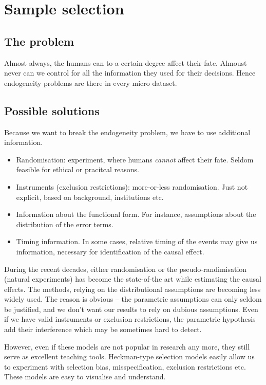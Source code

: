 \section{Sample selection}


\subsection{The problem}

Almost always, the humans can to a certain degree affect their fate.
Almoust never can we control for all the information they used for
their decisions.  Hence endogeneity problems are there in every micro
dataset.


\subsection{Possible solutions}

Because we want to break the endogeneity problem, we have to use
additional information.

\begin{itemize}
\item Randomisation: experiment, where humans \emph{cannot} affect
  their fate.  Seldom feasible for ethical or pracitcal reasons.
\item Instruments (exclusion restrictions): more-or-less
  randomisation.  Just not explicit, based on background, institutions
  etc.
\item Information about the functional form.  For instance,
  assumptions about the distribution of the error terms.
\item Timing information.  In some cases, relative timing of the
  events may give us information, necessary for identification of the
  causal effect.
\end{itemize}

During the recent decades, either randomisation or the
pseudo-randimisation (natural experiments) has become the state-of-the
art while estimating the causal effects.  The methods, relying on the
distributional assumptions are becoming less widely used.  The reason
is obvious -- the parametric assumptions can only seldom be justified,
and we don't want our results to rely on dubious assumptions.  Even if
we have valid instruments or exclusion restrictions, the parametric
hypothesis add their interference which may be sometimes hard to
detect.  

However, even if these models are not popular in research any more,
they still serve as excellent teaching tools.  Heckman-type selection
models easily allow us to experiment with selection bias,
misspecification, exclusion restrictions etc.  These models are easy
to visualise and understand.


